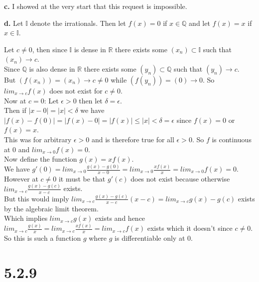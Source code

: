 \documentclass{article}
\begin{document}
{\Large\textbf{c.}} I showed at the very start that this request is impossible.

{\Large\textbf{d.}} Let $\mathbb{I}$ denote the irrationals. Then let $f(x) = 0$ if $x\in\mathbb{Q}$ and let $f(x) = x$ if $x\in\mathbb{I}$.
\begin{center}
    Let $c\neq 0$, then since $\mathbb{I}$ is dense in $\mathbb{R}$ there exists some $(x_n)\subset\mathbb{I}$ such that $(x_n)\rightarrow c$.
    \\Since $\mathbb{Q}$ is also dense in $\mathbb{R}$ there exists some $(y_n)\subset\mathbb{Q}$ such that $(y_n)\rightarrow c$.
    \\But $(f(x_n)) = (x_n)\rightarrow c\neq 0$ while $(f(y_n)) = (0)\rightarrow 0$. So $lim_{x\rightarrow c} f(x)$ does not exist for $c\neq 0$.
    \\Now at $c = 0$: Let $\epsilon > 0$ then let $\delta =\epsilon$.
    \\Then if $|x - 0| = |x| <\delta$ we have $|f(x) - f(0)| = |f(x) - 0| = |f(x)|\leq |x| <\delta =\epsilon$ since $f(x) = 0$ or $f(x) = x$.
    \\This was for arbitrary $\epsilon > 0$ and is therefore true for all $\epsilon > 0$. So $f$ is continuous at 0 and $lim_{x\rightarrow 0} f(x) = 0$.
    \\Now define the function $g(x) = x f(x)$.
    \\We have $g'(0) = lim_{x\rightarrow 0}\frac{g(x) - g(0)}{x - 0} = lim_{x\rightarrow 0}\frac{x f(x)}{x} = lim_{x\rightarrow 0} f(x) = 0$.
    \\However at $c\neq 0$ it must be that $g'(c)$ does not exist because otherwise $lim_{x\rightarrow c}\frac{g(x) - g(c)}{x - c}$ exists.
    \\But this would imply $lim_{x\rightarrow c}\frac{g(x) - g(c)}{x - c} (x - c) = lim_{x\rightarrow c} g(x) - g(c)$ exists by the algebraic limit theorem.
    \\Which implies $lim_{x\rightarrow c} g(x)$ exists and hence $lim_{x\rightarrow c}\frac{g(x)}{x} = lim_{x\rightarrow c}\frac{x f(x)}{x} = lim_{x\rightarrow c} f(x)$ exists which it doesn't since $c\neq 0$.
    \\So this is such a function $g$ where $g$ is differentiable only at 0.
\end{center}


\newpage
\section*{5.2.9}
\end{document}
